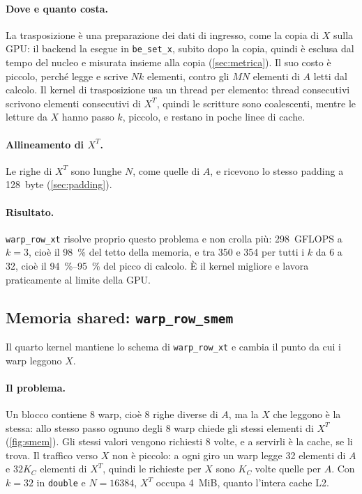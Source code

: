 \documentclass[11pt,a4paper]{article}
\begin{document}
\paragraph{Dove e quanto costa.} La trasposizione è una preparazione dei dati
di ingresso, come la copia di $X$ sulla GPU: il backend la esegue in
\texttt{be\_set\_x}, subito dopo la copia, quindi è esclusa dal tempo del
nucleo e misurata insieme alla copia (\cref{sec:metrica}). Il suo costo è
piccolo, perché legge e scrive $N k$ elementi, contro gli $M N$ elementi di $A$
letti dal calcolo. Il kernel di trasposizione usa un thread per elemento:
thread consecutivi scrivono elementi consecutivi di $X^T$, quindi le scritture sono coalescenti, mentre le letture da $X$ hanno passo $k$, piccolo, e restano in
poche linee di cache.

\paragraph{Allineamento di $X^T$.} Le righe di $X^T$ sono lunghe $N$, come
quelle di $A$, e ricevono lo stesso padding a \SI{128}{byte}
(\cref{sec:padding}).

\paragraph{Risultato.} \texttt{warp\_row\_xt} risolve proprio questo
problema e non crolla più: 298~GFLOPS a $k = 3$, cioè il \SI{98}{\percent} del
tetto della memoria, e tra 350 e 354 per tutti i $k$ da 6 a 32, cioè il
\SIrange{94}{95}{\percent} del picco di calcolo. È il kernel migliore e lavora
praticamente al limite della GPU.

\subsection{Memoria shared: \texttt{warp\_row\_smem}}\label{sec:warp-smem}

Il quarto kernel mantiene lo schema di \texttt{warp\_row\_xt} e cambia il punto
da cui i warp leggono $X$.

\paragraph{Il problema.} Un blocco contiene 8 warp, cioè 8 righe diverse di
$A$, ma la $X$ che leggono è la stessa: allo stesso passo ognuno degli 8 warp
chiede gli stessi elementi di $X^T$ (\cref{fig:smem}). Gli stessi valori
vengono richiesti 8
volte, e a servirli è la cache, se li trova. Il traffico verso $X$ non è
piccolo: a ogni giro un warp legge 32 elementi di $A$ e $32 K_C$ elementi di
$X^T$, quindi le richieste per $X$ sono $K_C$ volte quelle per $A$. Con
$k = 32$ in \texttt{double} e $N = 16384$, $X^T$ occupa \SI{4}{MiB}, quanto
l'intera cache L2.
\end{document}
